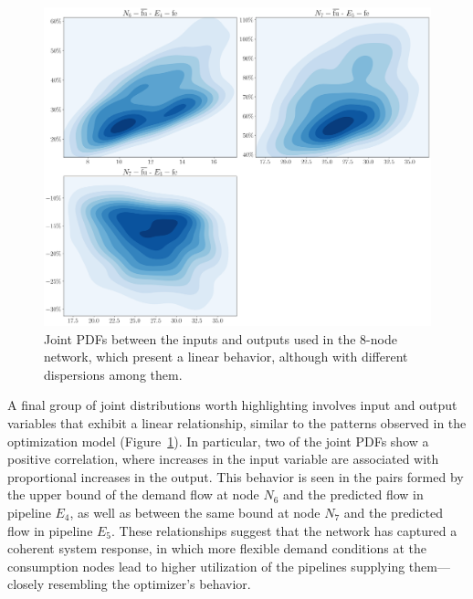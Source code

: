 \begin{figure}
    \begin{center}
        \includegraphics[width=.7\textwidth]{figures/Chapter_NonLinealCensnet/inputs_outputs_2 KDE.png}
    \end{center}
    \caption{Joint PDFs between the inputs and outputs used in the 8-node network, which present a linear behavior, although with different dispersions among them. }
    \label{fig:joint_distributions_inputs_outputs_2_KDE}
\end{figure}
 

A final group of joint distributions worth highlighting involves input and output variables that exhibit a linear relationship, similar to the patterns observed in the optimization model (Figure~\cref{fig:joint_distributions_inputs_outputs_2_KDE}). In particular, two of the joint PDFs show a positive correlation, where increases in the input variable are associated with proportional increases in the output. This behavior is seen in the pairs formed by the upper bound of the demand flow at node $N_6$ and the predicted flow in pipeline $E_4$, as well as between the same bound at node $N_7$ and the predicted flow in pipeline $E_5$. These relationships suggest that the network has captured a coherent system response, in which more flexible demand conditions at the consumption nodes lead to higher utilization of the pipelines supplying them—closely resembling the optimizer’s behavior.

